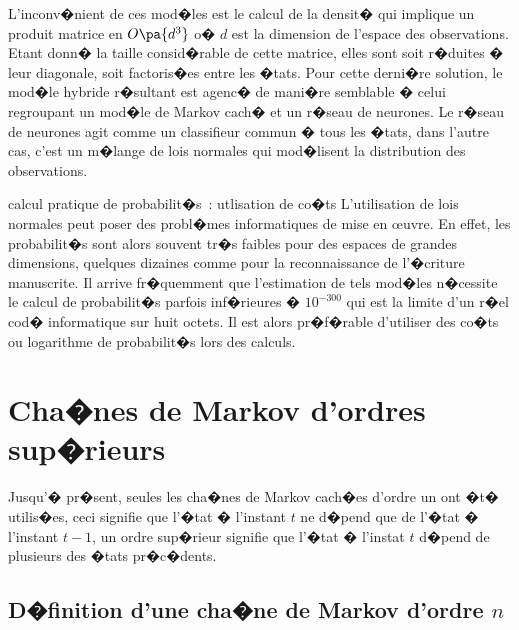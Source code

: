 L'inconv�nient de ces mod�les est le calcul de la densit� qui implique un produit matrice en $O\pa{d^3}$ o� $d$ est la dimension de l'espace des observations. Etant donn� la taille consid�rable de cette matrice, elles sont soit r�duites � leur diagonale, soit factoris�es entre les �tats. Pour cette derni�re solution, le mod�le hybride r�sultant est agenc� de mani�re semblable � celui regroupant un mod�le de Markov cach� et un r�seau de neurones. Le r�seau de neurones agit comme un classifieur commun � tous les �tats, dans l'autre cas, c'est un m�lange de lois normales qui mod�lisent la distribution des observations. 


\begin{xremark}{calcul pratique de probabilit�s~: utlisation de co�ts}
L'utilisation de lois normales  peut poser des probl�mes informatiques de mise en \oe uvre. En effet, les probabilit�s sont alors souvent tr�s faibles pour des espaces de grandes dimensions, quelques dizaines comme pour la reconnaissance de l'�criture manuscrite. Il arrive fr�quemment que l'estimation de tels mod�les n�cessite le calcul de probabilit�s parfois inf�rieures � $10^{-300}$ qui est la limite d'un r�el cod� informatique sur huit octets. Il est alors pr�f�rable d'utiliser des co�ts ou logarithme de probabilit�s lors des calculs.
\end{xremark}










\section{Cha�nes de Markov d'ordres sup�rieurs}

\label{par_chaine_ordre_superieur}

Jusqu'� pr�sent, seules les cha�nes de Markov cach�es d'ordre un ont �t� utilis�es, ceci signifie que l'�tat � l'instant $t$ ne d�pend que de l'�tat � l'instant $t-1$, un ordre sup�rieur signifie que l'�tat � l'instat $t$ d�pend de plusieurs des �tats pr�c�dents.

\subsection{D�finition d'une cha�ne de Markov d'ordre $n$}

